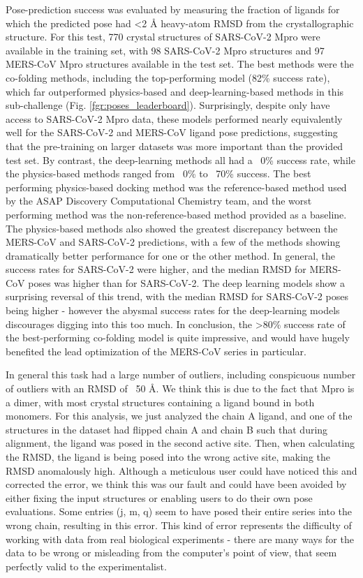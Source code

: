 \documentclass[journal=jcim,manuscript=article]{achemso}
\begin{document}
Pose-prediction success was evaluated by measuring the fraction of ligands for which the predicted pose had \textless 2 Å heavy-atom RMSD from the crystallographic structure. For this test, 770 crystal structures of SARS-CoV-2 Mpro were available in the training set, with 98 SARS-CoV-2 Mpro structures and 97 MERS-CoV Mpro structures available in the test set. The best methods were the co-folding methods, including the top-performing model (82\% success rate), which far outperformed physics-based and deep-learning-based methods in this sub-challenge (Fig. \ref{fgr:poses_leaderboard}). Surprisingly, despite only have access to SARS-CoV-2 Mpro data, these models performed nearly equivalently well for the SARS-CoV-2 and MERS-CoV ligand pose predictions, suggesting that the pre-training on larger datasets was more important than the provided test set. By contrast, the deep-learning methods all had a ~0\% success rate, while the physics-based methods ranged from ~0\% to ~70\% success. The best performing physics-based docking method was the reference-based method used by the ASAP Discovery Computational Chemistry team, and the worst performing method was the non-reference-based method provided as a baseline. The physics-based methods also showed the greatest discrepancy between the MERS-CoV and SARS-CoV-2 predictions, with a few of the methods showing dramatically better performance for one or the other method. In general, the success rates for SARS-CoV-2 were higher, and the median RMSD for MERS-CoV poses was higher than for SARS-CoV-2. The deep learning models show a surprising reversal of this trend, with the median RMSD for SARS-CoV-2 poses being higher - however the abysmal success rates for the deep-learning models discourages digging into this too much. In conclusion, the \textgreater 80\% success rate of the best-performing co-folding model is quite impressive, and would have hugely benefited the lead optimization of the MERS-CoV series in particular.

In general this task had a large number of outliers, including conspicuous number of outliers with an RMSD of ~50 Å. We think this is due to the fact that Mpro is a dimer, with most crystal structures containing a ligand bound in both monomers. For this analysis, we just analyzed the chain A ligand, and one of the structures in the dataset had flipped chain A and chain B such that during alignment, the ligand was posed in the second active site. Then, when calculating the RMSD, the ligand is being posed into the wrong active site, making the RMSD anomalously high. Although a meticulous user could have noticed this and corrected the error, we think this was our fault and could have been avoided by either fixing the input structures or enabling users to do their own pose evaluations. Some entries (j, m, q) seem to have posed their entire series into the wrong chain, resulting in this error. This kind of error represents the difficulty of working with data from real biological experiments - there are many ways for the data to be wrong or misleading from the computer's point of view, that seem perfectly valid to the experimentalist.
\end{document}

